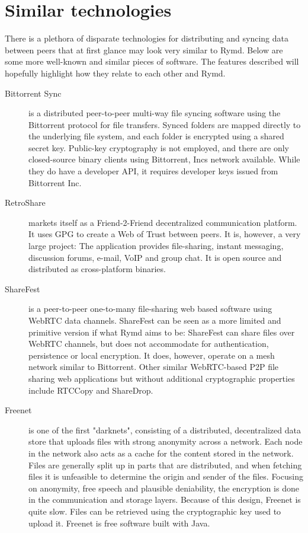 \section{Similar technologies}
There is a plethora of disparate technologies for distributing and syncing data between peers that at first glance may look very similar to Rymd. Below are some more well-known and similar pieces of software. The features described will hopefully highlight how they relate to each other and Rymd.
\begin{description}
  \item[Bittorrent Sync] \cite{BitTorent:2014:Online} is a distributed peer-to-peer multi-way file syncing software using the Bittorrent protocol for file transfers. Synced folders are mapped directly to the underlying file system, and each folder is encrypted using a shared secret key. Public-key cryptography is not employed, and there are only closed-source binary clients using Bittorrent, Incs network available. While they do have a developer API, it requires developer keys issued from Bittorrent Inc.
  \item[RetroShare] \cite{Retroshare:2014:Online} markets itself as a Friend-2-Friend decentralized communication platform. It uses GPG to create a Web of Trust between peers. It is, however, a very large project: The application provides file-sharing, instant messaging, discussion forums, e-mail, VoIP and group chat. It is open source and distributed as cross-platform binaries.
  \item[ShareFest] \cite{Sharefest:2014:Online} is a peer-to-peer one-to-many file-sharing web based software using WebRTC data channels. ShareFest can be seen as a more limited and primitive version if what Rymd aims to be: ShareFest can share files over WebRTC channels, but does not accommodate for authentication, persistence or local encryption. It does, however, operate on a mesh network similar to Bittorrent. Other similar WebRTC-based P2P file sharing web applications but without additional cryptographic properties include RTCCopy and ShareDrop.
  \item[Freenet] \cite{Freenet:2014:Online} is one of the first "darknets", consisting of a distributed, decentralized data store that uploads files with strong anonymity across a network. Each node in the network also acts as a cache for the content stored in the network. Files are generally split up in parts that are distributed, and when fetching files it is unfeasible to determine the origin and sender of the files. Focusing on anonymity, free speech and plausible deniability, the encryption is done in the communication and storage layers. Because of this design, Freenet is quite slow. Files can be retrieved using the cryptographic key used to upload it. Freenet is free software built with Java.

\end{description}
